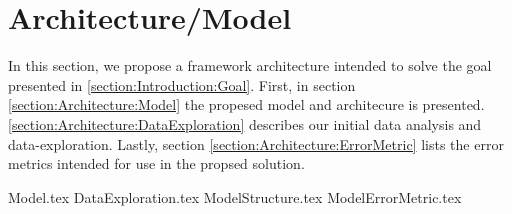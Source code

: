 \chapter{Architecture/Model}
\label{section:Architecture}

In this section, we propose a framework architecture intended to solve the goal presented in \autoref{section:Introduction:Goal}.
First, in section \ref{section:Architecture:Model} the propesed model and architecure is presented.
\autoref{section:Architecture:DataExploration} describes our initial data analysis and data-exploration.
Lastly, section \ref{section:Architecture:ErrorMetric} lists the error metrics intended for use in the propsed solution.

{Model.tex}
{DataExploration.tex}
{ModelStructure.tex}
{ModelErrorMetric.tex}


\iffalse
  Here you will present the architecture or model that you have chosen, and that is (or will be) implemented in your work. Note that putting algorithms in your report is not desirable but in certain cases these might be placed in the appendix. Code further be avoided in the report itself but may be delivered in the fashion requested by the supervisor or, in the case of masters delivery, submitted as additional documents.
\fi

